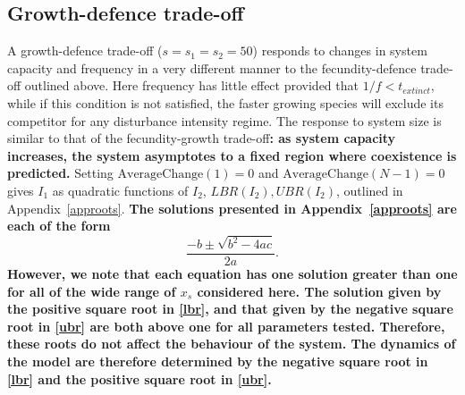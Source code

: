 \documentclass[preprint,10pt,reqno]{report}
\begin{document}
\subsection{Growth-defence trade-off}
A growth-defence trade-off ($s=s_1=s_2=50$) responds to changes in system capacity and frequency in a very different manner to the fecundity-defence trade-off outlined above. Here frequency has little effect provided that $1/f<t_{extinct}$, while if this condition is not satisfied, the faster growing species will exclude its competitor for any disturbance intensity regime. The response to system size is similar to that of the fecundity-growth trade-off\textbf{: as system capacity increases, the system asymptotes to a fixed region where coexistence is predicted.} Setting $\text{AverageChange}(1)=0$ and $\text{AverageChange}(N-1)=0$ gives $I_1$ as quadratic functions of $I_2$, $LBR(I_2), UBR(I_2)$, outlined in Appendix~\ref{approots}.
\textbf{The solutions presented in Appendix~\ref{approots} are each of the form
$$
\frac{-b\pm \sqrt{b^2-4ac}}{2a}.
$$ 
However, we note that each equation has one solution greater than one for all of the wide range of $x_s$ considered here. The solution given by the positive square root in \eqref{lbr}, and that given by the negative square root in \eqref{ubr} are both above one for all parameters tested. Therefore, these roots do not affect the behaviour of the system. The dynamics of the model are therefore determined by the negative square root in \eqref{lbr} and the positive square root in \eqref{ubr}.}
\end{document}
